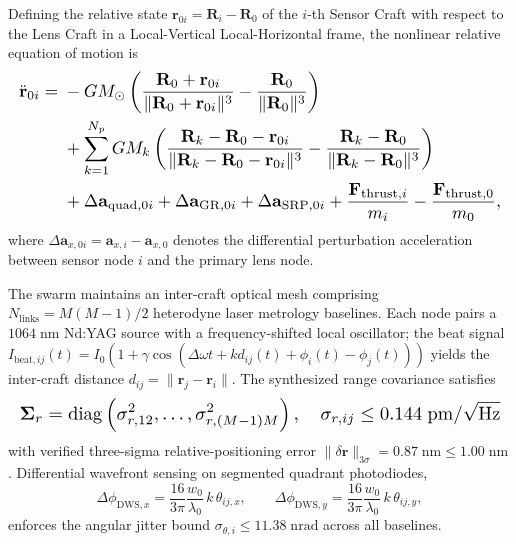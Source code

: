 \documentclass[10pt,twocolumn]{IEEEtran}
\begin{document}
Defining the relative state $\mathbf{r}_{0i}=\mathbf{R}_i-\mathbf{R}_0$
of the $i$-th Sensor Craft with respect to the Lens Craft in a
Local-Vertical Local-Horizontal frame, the nonlinear relative equation of
motion is
\begin{equation}
\resizebox{\columnwidth}{!}{$
\begin{aligned}
\ddot{\mathbf{r}}_{0i}={}&-GM_{\odot}\left(
\frac{\mathbf{R}_0+\mathbf{r}_{0i}}{\|\mathbf{R}_0+\mathbf{r}_{0i}\|^{3}}
-\frac{\mathbf{R}_0}{\|\mathbf{R}_0\|^{3}}\right)\\
&+\sum_{k=1}^{N_p}GM_k\left(
\frac{\mathbf{R}_k-\mathbf{R}_0-\mathbf{r}_{0i}}
{\|\mathbf{R}_k-\mathbf{R}_0-\mathbf{r}_{0i}\|^{3}}
-\frac{\mathbf{R}_k-\mathbf{R}_0}{\|\mathbf{R}_k-\mathbf{R}_0\|^{3}}\right)\\
&+\Delta\mathbf{a}_{\mathrm{quad},0i}+\Delta\mathbf{a}_{\mathrm{GR},0i}
+\Delta\mathbf{a}_{\mathrm{SRP},0i}
+\frac{\mathbf{F}_{\mathrm{thrust},i}}{m_i}
-\frac{\mathbf{F}_{\mathrm{thrust},0}}{m_0},
\end{aligned}$}
\label{eq:relative_eom}
\end{equation}
where $\Delta\mathbf{a}_{x,0i}=\mathbf{a}_{x,i}-\mathbf{a}_{x,0}$ denotes
the differential perturbation acceleration between sensor node $i$ and the
primary lens node.

The swarm maintains an inter-craft optical mesh comprising
$N_{\mathrm{links}}=M(M-1)/2$ heterodyne laser metrology baselines. Each
node pairs a $1064\;\mathrm{nm}$ Nd:YAG source with a frequency-shifted
local oscillator; the beat signal
$I_{\mathrm{beat},ij}(t)=I_0\left(1+\gamma\cos(\Delta\omega t
+kd_{ij}(t)+\phi_i(t)-\phi_j(t))\right)$ yields the inter-craft distance
$d_{ij}=\|\mathbf{r}_j-\mathbf{r}_i\|$. The synthesized range covariance
satisfies
\begin{equation}
\resizebox{\columnwidth}{!}{$
\displaystyle \mathbf{\Sigma}_r=\operatorname{diag}\left(\sigma_{r,12}^{2},\dots,
\sigma_{r,(M-1)M}^{2}\right),\quad
\sigma_{r,ij}\leq0.144\;\mathrm{pm}/\sqrt{\mathrm{Hz}}$}
\label{eq:range_cov}
\end{equation}
with verified three-sigma relative-positioning error
$\|\delta\mathbf{r}\|_{3\sigma}=0.87\;\mathrm{nm}\leq1.00\;\mathrm{nm}$.
Differential wavefront sensing on segmented quadrant photodiodes,
\begin{equation}
\Delta\phi_{\mathrm{DWS},x}=\frac{16}{3\pi}\frac{w_0}{\lambda_0}\,k\,
\theta_{ij,x},\qquad
\Delta\phi_{\mathrm{DWS},y}=\frac{16}{3\pi}\frac{w_0}{\lambda_0}\,k\,
\theta_{ij,y},
\label{eq:dws_mesh}
\end{equation}
enforces the angular jitter bound
$\sigma_{\theta,i}\leq11.38\;\mathrm{nrad}$ across all baselines.
\end{document}

